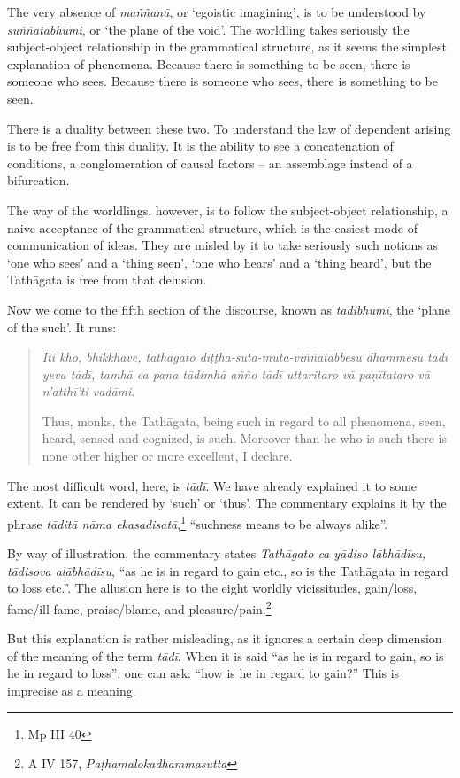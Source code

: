 The very absence of \emph{maññanā}, or `egoistic imagining', is to be understood by \emph{suññatābhūmi}, or `the plane of the void'. The worldling takes seriously the subject-object relationship in the grammatical structure, as it seems the simplest explanation of phenomena. Because there is something to be seen, there is someone who sees. Because there is someone who sees, there is something to be seen.

There is a duality between these two. To understand the law of dependent arising is to be free from this duality. It is the ability to see a concatenation of conditions, a conglomeration of causal factors -- an assemblage instead of a bifurcation.

The way of the worldlings, however, is to follow the subject-object relationship, a naive acceptance of the grammatical structure, which is the easiest mode of communication of ideas. They are misled by it to take seriously such notions as `one who sees' and a `thing seen', `one who hears' and a `thing heard', but the Tathāgata is free from that delusion.

Now we come to the fifth section of the discourse, known as \emph{tādibhūmi}, the `plane of the such'. It runs:

\begin{quote}
\emph{Iti kho, bhikkhave, tathāgato diṭṭha-suta-muta-viññātabbesu dhammesu tādī yeva tādī, tamhā ca pana tādimhā añño tādī uttaritaro vā paṇītataro vā n'atthī'ti vadāmi}.

Thus, monks, the Tathāgata, being such in regard to all phenomena, seen, heard, sensed and cognized, is such. Moreover than he who is such there is none other higher or more excellent, I declare.
\end{quote}

The most difficult word, here, is \emph{tādī}. We have already explained it to some extent. It can be rendered by `such' or `thus'. The commentary explains it by the phrase \emph{tāditā nāma ekasadisatā},\footnote{Mp III 40} ``suchness means to be always alike''.

By way of illustration, the commentary states \emph{Tathāgato ca yādiso lābhādīsu, tādisova alābhādīsu}, ``as he is in regard to gain etc., so is the Tathāgata in regard to loss etc.''. The allusion here is to the eight worldly vicissitudes, gain/loss, fame/ill-fame, praise/blame, and pleasure/pain.\footnote{A IV 157, \emph{Paṭhamalokadhammasutta}}

But this explanation is rather misleading, as it ignores a certain deep dimension of the meaning of the term \emph{tādī}. When it is said ``as he is in regard to gain, so is he in regard to loss'', one can ask: ``how is he in regard to gain?'' This is imprecise as a meaning.

